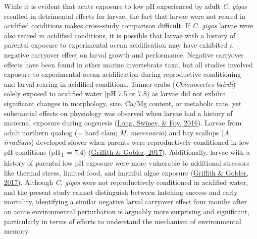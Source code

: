 \documentclass [11pt, proquest] {uwthesis}[2015/03/03]
\begin{document}
While it is evident that acute exposure to low pH experienced by adult \emph{C. gigas} resulted in detrimental effects for larvae, the fact that larvae were not reared in acidified conditions makes cross-study comparison difficult. If \emph{C. gigas} larvae were also reared in acidified conditions, it is possible that larvae with a history of parental exposure to experimental ocean acidification may have exhibited a negative carryover effect on larval growth and performance. Negative carryover effects have been found in other marine invertebrate taxa, but all studies involved exposure to experimental ocean acidification during reproductive conditioning and larval rearing in acidified conditions. Tanner crabs (\emph{Chionoecetes bairdi}) solely exposed to acidified water (pH 7.5 or 7.8) as larvae did not exhibit significant changes in morphology, size, Ca/Mg content, or metabolic rate, yet substantial effects on physiology was observed when larvae had a history of maternal exposure during oogenesis (\protect\hyperlink{ref-Long2016}{Long, Swiney, \& Foy, 2016}). Larvae from adult northern quahog (= hard clam; \emph{M. mercenaria}) and bay scallops (\emph{A. irradians}) developed slower when parents were reproductively conditioned in low pH conditions (pH\textsubscript{T} = 7.4) (\protect\hyperlink{ref-Griffith2017}{Griffith \& Gobler, 2017}). Additionally, larvae with a history of parental low pH exposure were more vulnerable to additional stressors like thermal stress, limited food, and harmful algae exposure (\protect\hyperlink{ref-Griffith2017}{Griffith \& Gobler, 2017}). Although \emph{C. gigas} were not reproductively conditioned in acidified water, and the present study cannot distinguish between hatching success and early mortality, identifying a similar negative larval carryover effect four months after an acute environmental perturbation is arguably more surprising and significant, particularly in terms of efforts to understand the mechanism of environmental memory.
\end{document}
